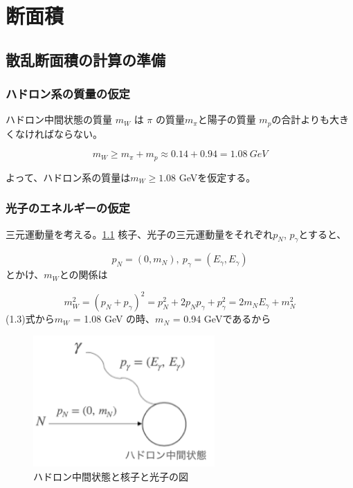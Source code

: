 \chapter{断面積} \label{cha:cross_section}
\section{散乱断面積の計算の準備}
\subsection{ハドロン系の質量の仮定}
ハドロン中間状態の質量 $m_W$ は $\pi$ の質量$m_\pi$と陽子の質量 $m_p$の合計よりも大きくなければならない。

\begin{equation}
    m_W \geq m_\pi + m_p \approx 0.14 + 0.94 = 1.08 \ GeV
\end{equation}

よって、ハドロン系の質量は$m_W \geq 1.08$ GeVを仮定する。


\subsection{光子のエネルギーの仮定}
三元運動量を考える。\ref{fig:test2}
核子、光子の三元運動量をそれぞれ$p_N$, $p_\gamma$とすると、

\begin{equation}
    p_N = (0, m_N),\  p_\gamma = (E_\gamma, E_\gamma)
\end{equation}
とかけ、$m_W$との関係は

\begin{equation}
    m_W^2 = (p_N + p_\gamma)^2 = p_N^2 + 2p_N p_\gamma + p_\gamma^2
    = 2m_N E_\gamma + m_N^2
\end{equation}
(1.3)式から$m_W$ = 1.08 GeV の時、$m_N$ = 0.94 GeVであるから

\begin{figure}[H]
    \centering
    \includegraphics[height=5cm]{img/diagram_momentum.png}
    \caption{ハドロン中間状態と核子と光子の図}
    \label{fig:test2}
\end{figure}

